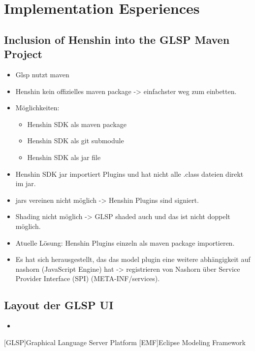 \documentclass[conference,onecolumn]{IEEEtran}
\begin{document}
  \section{Implementation Esperiences}

  \subsection{Inclusion of Henshin into the GLSP Maven Project}

  \begin{itemize}
    \item   Glsp nutzt maven
    \item Henshin kein offizielles maven package -> einfachster weg zum einbetten.
    \item Möglichkeiten:
      \begin{itemize}
        \item Henshin SDK als maven package
        \item Henshin SDK als git submodule
        \item Henshin SDK als jar file
      \end{itemize}
    \item Henshin SDK jar importiert Plugins und hat nicht alle .class dateien direkt im jar.
    \item jars vereinen nicht möglich -> Henshin Plugins sind signiert.
    \item Shading nicht möglich -> GLSP shaded auch und das ist nicht doppelt möglich.
    \item Atuelle Lösung: Henshin Plugins einzeln als maven package importieren.
    \item Es hat sich herausgestellt, das das model plugin eine weitere abhängigkeit auf nashorn (JavaScript Engine) hat -> registrieren von Nashorn über Service Provider Interface (SPI) (META-INF/services).
  \end{itemize}

  \subsection{Layout der GLSP UI}
  \begin{itemize}
    \item 
  \end{itemize}



  \printbibliography

  \begin{acronym}
    [GLSP]{Graphical Language Server Platform}
    [EMF]{Eclipse Modeling Framework}

  \end{acronym}
\end{document}
